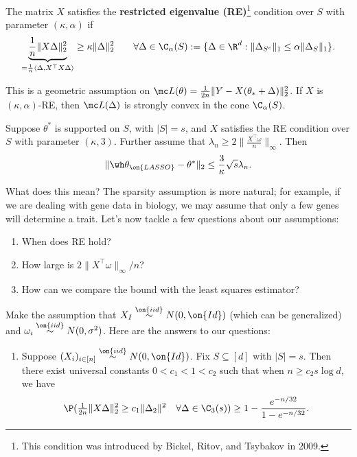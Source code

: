 \begin{ex}
\begin{enumerate}[label = (\alph*)]
\begin{defn}
The matrix $X$ satisfies the \textbf{restricted eigenvalue (RE)}\footnote{This condition was introduced by Bickel, Ritov, and Tsybakov in 2009.} condition over $S$ with parameter $(\kappa,\alpha)$ if
$$\underbrace{\frac{1}{n} \| X \Delta \|_2^2}_{= \frac{1}{n} \langle \Delta, X^\top X \Delta \rangle} \geq \kappa \| \Delta \|_2^2 \qquad \forall \Delta \in \C_\alpha(S) : = \{ \Delta \in \R^d : \| \Delta_{S^c} \|_1 \leq \alpha \| \Delta_S \|_1 \}.$$
\end{defn}

This is a geometric assumption on $\mc L(\theta) = \frac{1}{2n} \| Y - X(\theta_* + \Delta) \|_2^2$. If $X$ is $(\kappa,\alpha)$-RE, then $\mc L(\Delta)$ is strongly convex in the cone $\C_\alpha(S)$.

\begin{thm}
Suppose $\theta^*$ is supported on $S$, with $|S| = s$, and $X$ satisfies the RE condition over $S$ with parameter $(\kappa, 3)$. Further assume that $\lambda_n \geq 2 \| \frac{X^\top \omega}{n} \|_\infty$. Then
$$\| \wh \theta_{\on{LASSO}} - \theta^* \|_2 \leq \frac{3}{\kappa} \sqrt s \lambda_n.$$
\end{thm}

What does this mean? The sparsity assumption is more natural; for example, if we are dealing with gene data in biology, we may assume that only a few genes will determine a trait. Let's now tackle a few questions about our assumptions:

\begin{enumerate}[label = \arabic*.]

\item When does RE hold?

\item How large is $2 \| X^\top \omega \|_\infty/n$?

\item How can we compare the bound with the least squares estimator?

\end{enumerate}

Make the assumption that $X_I \overset{\on{iid}}{\sim} N(0,\on{Id})$ (which can be generalized) and $\omega_i \overset{\on{iid}}{\sim} N(0,\sigma^2)$. Here are the answers to our questions:

\begin{enumerate}[label = \arabic*.]

\item
\begin{prop}
Suppose $(X_i)_{i \in [n]} \overset{\on{iid}}{\sim} N(0,\on{Id})$. Fix $S \subseteq [d]$ with $|S| = s$. Then there exist universal constants $0 < c_1 < 1 < c_2$ such that when $n \geq c_2 s \log d$, we have
$$\P( \tfrac{1}{2n} \| X \Delta \|_2^2 \geq c_1 \| \Delta_2\|^2 \quad \forall \Delta \in \C_3(s)) \geq 1 - \frac{e^{-n/32}}{1- e^{-n/32}}.$$
\end{prop}


\end{enumerate}
\end{enumerate}
\end{ex}
